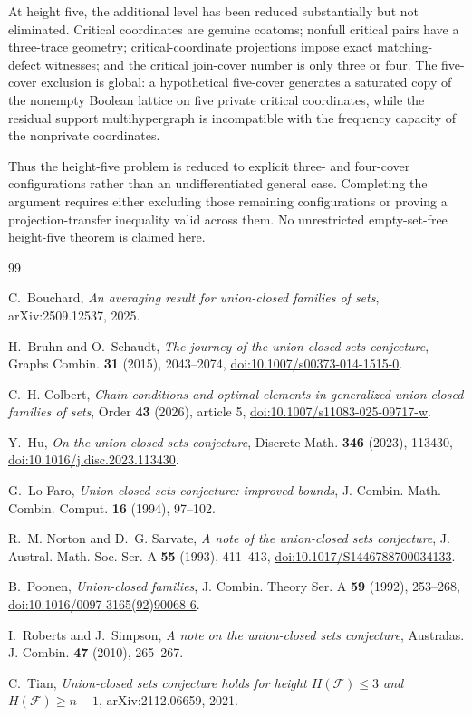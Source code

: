 \documentclass[11pt,reqno]{amsart}
\numberwithin{equation}{section}
\theoremstyle{definition}
\theoremstyle{remark}
\newcommand{\F}{\mathcal{F}}
\newcommand{\1}{\mathbf{1}}
\begin{document}
At height five, the additional level has been reduced substantially but not eliminated.  Critical coordinates are genuine coatoms; nonfull critical pairs have a three-trace geometry; critical-coordinate projections impose exact matching-defect witnesses; and the critical join-cover number is only three or four.  The five-cover exclusion is global: a hypothetical five-cover generates a saturated copy of the nonempty Boolean lattice on five private critical coordinates, while the residual support multihypergraph is incompatible with the frequency capacity of the nonprivate coordinates.

Thus the height-five problem is reduced to explicit three- and four-cover configurations rather than an undifferentiated general case.  Completing the argument requires either excluding those remaining configurations or proving a projection-transfer inequality valid across them.  No unrestricted empty-set-free height-five theorem is claimed here.

\begin{thebibliography}{99}

C.~Bouchard,
\emph{An averaging result for union-closed families of sets},
arXiv:2509.12537, 2025.

H.~Bruhn and O.~Schaudt,
\emph{The journey of the union-closed sets conjecture},
Graphs Combin. \textbf{31} (2015), 2043--2074,
\href{https://doi.org/10.1007/s00373-014-1515-0}{doi:10.1007/s00373-014-1515-0}.

C.~H. Colbert,
\emph{Chain conditions and optimal elements in generalized union-closed families of sets},
Order \textbf{43} (2026), article 5,
\href{https://doi.org/10.1007/s11083-025-09717-w}{doi:10.1007/s11083-025-09717-w}.

Y.~Hu,
\emph{On the union-closed sets conjecture},
Discrete Math. \textbf{346} (2023), 113430,
\href{https://doi.org/10.1016/j.disc.2023.113430}{doi:10.1016/j.disc.2023.113430}.

G.~Lo Faro,
\emph{Union-closed sets conjecture: improved bounds},
J. Combin. Math. Combin. Comput. \textbf{16} (1994), 97--102.

R.~M. Norton and D.~G. Sarvate,
\emph{A note of the union-closed sets conjecture},
J. Austral. Math. Soc. Ser. A \textbf{55} (1993), 411--413,
\href{https://doi.org/10.1017/S1446788700034133}{doi:10.1017/S1446788700034133}.

B.~Poonen,
\emph{Union-closed families},
J. Combin. Theory Ser. A \textbf{59} (1992), 253--268,
\href{https://doi.org/10.1016/0097-3165(92)90068-6}{doi:10.1016/0097-3165(92)90068-6}.

I.~Roberts and J.~Simpson,
\emph{A note on the union-closed sets conjecture},
Australas. J. Combin. \textbf{47} (2010), 265--267.

C.~Tian,
\emph{Union-closed sets conjecture holds for height \(H(\F)\le3\) and \(H(\F)\ge n-1\)},
arXiv:2112.06659, 2021.

\end{thebibliography}
\end{document}
